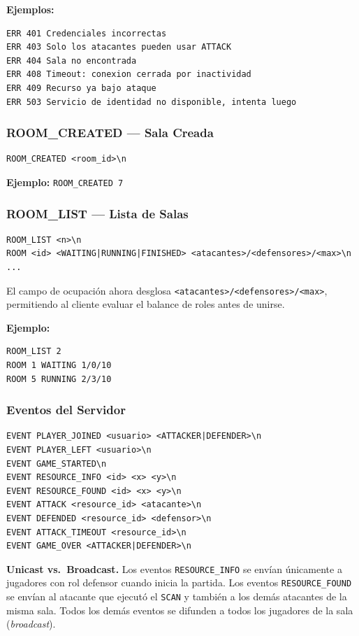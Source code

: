 \documentclass[12pt, letterpaper]{article}
\begin{document}
\textbf{Ejemplos:}
\begin{lstlisting}
ERR 401 Credenciales incorrectas
ERR 403 Solo los atacantes pueden usar ATTACK
ERR 404 Sala no encontrada
ERR 408 Timeout: conexion cerrada por inactividad
ERR 409 Recurso ya bajo ataque
ERR 503 Servicio de identidad no disponible, intenta luego
\end{lstlisting}

\subsubsection{ROOM\_CREATED --- Sala Creada}

\begin{lstlisting}
ROOM_CREATED <room_id>\n
\end{lstlisting}

\textbf{Ejemplo:} \texttt{ROOM\_CREATED 7}

\subsubsection{ROOM\_LIST --- Lista de Salas}
\label{sec:room-list}

\begin{lstlisting}
ROOM_LIST <n>\n
ROOM <id> <WAITING|RUNNING|FINISHED> <atacantes>/<defensores>/<max>\n
...
\end{lstlisting}

El campo de ocupación ahora desglosa \texttt{<atacantes>/<defensores>/<max>}, permitiendo al cliente evaluar el balance de roles antes de unirse.

\textbf{Ejemplo:}
\begin{lstlisting}
ROOM_LIST 2
ROOM 1 WAITING 1/0/10
ROOM 5 RUNNING 2/3/10
\end{lstlisting}

\subsubsection{Eventos del Servidor}

\begin{lstlisting}
EVENT PLAYER_JOINED <usuario> <ATTACKER|DEFENDER>\n
EVENT PLAYER_LEFT <usuario>\n
EVENT GAME_STARTED\n
EVENT RESOURCE_INFO <id> <x> <y>\n
EVENT RESOURCE_FOUND <id> <x> <y>\n
EVENT ATTACK <resource_id> <atacante>\n
EVENT DEFENDED <resource_id> <defensor>\n
EVENT ATTACK_TIMEOUT <resource_id>\n
EVENT GAME_OVER <ATTACKER|DEFENDER>\n
\end{lstlisting}

\begin{nota}
\textbf{Unicast vs.\ Broadcast.} Los eventos \texttt{RESOURCE\_INFO} se envían
únicamente a jugadores con rol defensor cuando inicia la partida. Los eventos \texttt{RESOURCE\_FOUND}
se envían al atacante que ejecutó el \texttt{SCAN} y también a los demás atacantes
de la misma sala. Todos los demás
eventos se difunden a todos los jugadores de la sala (\textit{broadcast}).
\end{nota}
\end{document}
